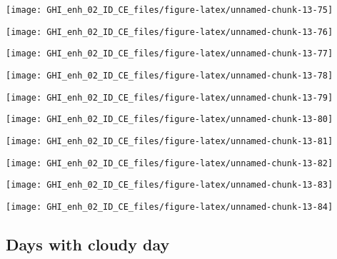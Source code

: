 \documentclass[
  10pt,
  a4paper,oneside]{article}
\begin{document}
\begin{center}\texttt{[image: GHI\_enh\_02\_ID\_CE\_files/figure-latex/unnamed-chunk-13-75]} \end{center}

\begin{center}\texttt{[image: GHI\_enh\_02\_ID\_CE\_files/figure-latex/unnamed-chunk-13-76]} \end{center}

\begin{center}\texttt{[image: GHI\_enh\_02\_ID\_CE\_files/figure-latex/unnamed-chunk-13-77]} \end{center}

\begin{center}\texttt{[image: GHI\_enh\_02\_ID\_CE\_files/figure-latex/unnamed-chunk-13-78]} \end{center}

\begin{center}\texttt{[image: GHI\_enh\_02\_ID\_CE\_files/figure-latex/unnamed-chunk-13-79]} \end{center}

\begin{center}\texttt{[image: GHI\_enh\_02\_ID\_CE\_files/figure-latex/unnamed-chunk-13-80]} \end{center}

\begin{center}\texttt{[image: GHI\_enh\_02\_ID\_CE\_files/figure-latex/unnamed-chunk-13-81]} \end{center}

\begin{center}\texttt{[image: GHI\_enh\_02\_ID\_CE\_files/figure-latex/unnamed-chunk-13-82]} \end{center}

\begin{center}\texttt{[image: GHI\_enh\_02\_ID\_CE\_files/figure-latex/unnamed-chunk-13-83]} \end{center}

\begin{center}\texttt{[image: GHI\_enh\_02\_ID\_CE\_files/figure-latex/unnamed-chunk-13-84]} \end{center}

\FloatBarrier

\hypertarget{days-with-cloudy-day}{%
\subsection{Days with cloudy day}\label{days-with-cloudy-day}}
\end{document}
